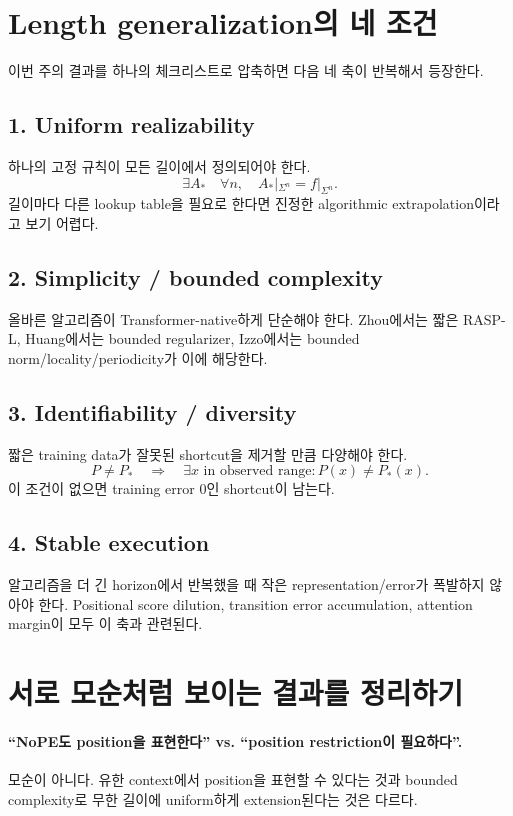\documentclass[11pt,a4paper,oneside,openany]{memoir}
\theoremstyle{definition}
\begin{document}
\section{Length generalization의 네 조건}

이번 주의 결과를 하나의 체크리스트로 압축하면 다음 네 축이 반복해서 등장한다.

\subsection{1. Uniform realizability}
하나의 고정 규칙이 모든 길이에서 정의되어야 한다.
\[
\exists A_*\quad\forall n,\quad A_*|_{\Sigma^n}=f|_{\Sigma^n}.
\]
길이마다 다른 lookup table을 필요로 한다면 진정한 algorithmic extrapolation이라고 보기 어렵다.

\subsection{2. Simplicity / bounded complexity}
올바른 알고리즘이 Transformer-native하게 단순해야 한다.
Zhou에서는 짧은 RASP-L, Huang에서는 bounded regularizer, Izzo에서는 bounded norm/locality/periodicity가 이에 해당한다.

\subsection{3. Identifiability / diversity}
짧은 training data가 잘못된 shortcut을 제거할 만큼 다양해야 한다.
\[
P\ne P_*\quad\Rightarrow\quad
\exists x\text{ in observed range}:P(x)\ne P_*(x).
\]
이 조건이 없으면 training error 0인 shortcut이 남는다.

\subsection{4. Stable execution}
알고리즘을 더 긴 horizon에서 반복했을 때 작은 representation/error가 폭발하지 않아야 한다.
Positional score dilution, transition error accumulation, attention margin이 모두 이 축과 관련된다.

\section{서로 모순처럼 보이는 결과를 정리하기}

\paragraph{``NoPE도 position을 표현한다'' vs. ``position restriction이 필요하다''.}
모순이 아니다. 유한 context에서 position을 표현할 수 있다는 것과 bounded complexity로 무한 길이에 uniform하게 extension된다는 것은 다르다.
\end{document}
